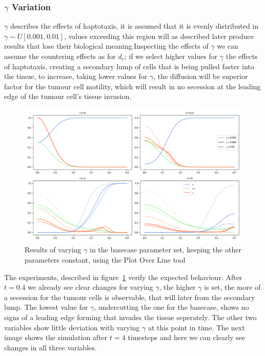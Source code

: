 \subsubsection*{$\gamma$ Variation}
$\gamma$ describes the effects of haptotaxis, it is assumed that it is evenly distributed in $\gamma \sim U[0.001,0.01]$, values exceeding this region will as described later produce results that lose their biological meaning.Inspecting the effects of $\gamma$ we can assume the countering effects as for $d_c$; if we select higher values for $\gamma$ the effects of haptotaxis, creating a secondary lump of cells that is being pulled faster into the tissue, to increase, taking lower values for $\gamma$, the diffusion will be superior factor for the tumour cell motility, which will result in no secession at the leading edge of the tumour cell's tissue invasion.
\begin{figure}[h]
    \centering
    \includegraphics[width=\textwidth]{resources/images/gamma_variation.png}
    \caption{Results of varying $\gamma$ in the basecase parameter set, keeping the other parameters constant, using the Plot Over Line tool}
    \label{fig:gamma_variation}
\end{figure}
The experiments, described in figure~\ref{fig:gamma_variation} verify the expected behaviour. After $t=0.4$ we already see clear changes for varying $\gamma$, the higher $\gamma$ is set, the more of a secession for the tumour cells is observable, that will later from the secondary lump. The lowest value for $\gamma$, undercutting the one for the basecase, shows no signs of a leading edge forming that invades the tissue seperately. The other two variables show little deviation with varying $\gamma$ at this point in time. \newline 
The next image shows the simulation after $t=4$ timesteps and here we can clearly see changes in all three variables. 
